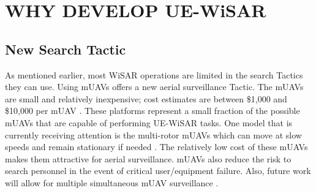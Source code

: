 \documentclass[12pt]{IEEEtran}
\begin{document}
% 

\section{WHY DEVELOP UE-WiSAR}
\subsection{New Search Tactic}
As mentioned earlier, most WiSAR operations are limited in the search Tactics
they can use.  Using mUAVs offers a new aerial surveillance Tactic.  The mUAVs
are small and relatively inexpensive; cost estimates are between \$1,000 and
\$10,000 per mUAV
\cite{goodrich2008supporting,goodrich2007using,adams2007camera}.
These platforms represent a small fraction of the possible mUAVs that are capable of performing
UE-WiSAR tasks.  One model that is currently receiving attention is the
multi-rotor mUAVs which can move at slow speeds and remain stationary if needed
\cite{almurib2011control}.  The relatively low cost of these mUAVs makes them
attractive for aerial surveillance.  mUAVs also reduce the risk to search
personnel in the event of critical user/equipment failure.  Also, future work
will allow for multiple simultaneous mUAV surveillance 
\cite{waharte2009coordinated}.  
\end{document}
